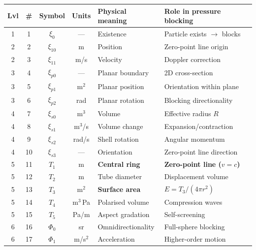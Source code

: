 \begin{table}[h]
\centering
\small
\begin{tabular}{|c|c|c|c|p{4.0cm}|p{4.0cm}|}
\hline
\textbf{Lvl} & \textbf{\#} & \textbf{Symbol} & \textbf{Units} & \textbf{Physical meaning} & \textbf{Role in pressure blocking} \\
\hline
1 & 1  & $\xi_0$       & ---        & Existence                  & Particle exists $\to$ blocks \\
\hline
2 & 2  & $\xi_{10}$    & m          & Position                   & Zero-point line origin \\
2 & 3  & $\xi_{11}$    & m/s        & Velocity                   & Doppler correction \\
\hline
3 & 4  & $\xi_{p0}$    & ---        & Planar boundary            & 2D cross-section \\
3 & 5  & $\xi_{p1}$    & m$^2$      & Planar position            & Orientation within plane \\
3 & 6  & $\xi_{p2}$    & rad        & Planar rotation            & Blocking directionality \\
\hline
4 & 7  & $\xi_{s0}$    & m$^3$      & Volume                     & Effective radius $R$ \\
4 & 8  & $\xi_{s1}$    & m$^3$/s    & Volume change              & Expansion/contraction \\
4 & 9  & $\xi_{s2}$    & rad/s      & Shell rotation             & Angular momentum \\
4 & 10 & $\xi_{s3}$    & ---        & Orientation                & Zero-point line direction \\
\hline
5 & 11 & $T_1$         & m          & \textbf{Central ring}      & \textbf{Zero-point line ($v = c$)} \\
5 & 12 & $T_2$         & m          & Tube diameter              & Displacement volume \\
5 & 13 & $T_3$         & m$^2$      & \textbf{Surface area}      & \textbf{$E = T_3/(4\pi r^2)$} \\
5 & 14 & $T_4$         & m$^3$\,Pa  & Polarised volume           & Compression waves \\
5 & 15 & $T_5$         & Pa/m       & Aspect gradation           & Self-screening \\
\hline
6 & 16 & $\Phi_0$      & sr         & Omnidirectionality         & Full-sphere blocking \\
6 & 17 & $\Phi_1$      & m/s$^2$    & Acceleration               & Higher-order motion \\

\end{tabular}
\end{table}
